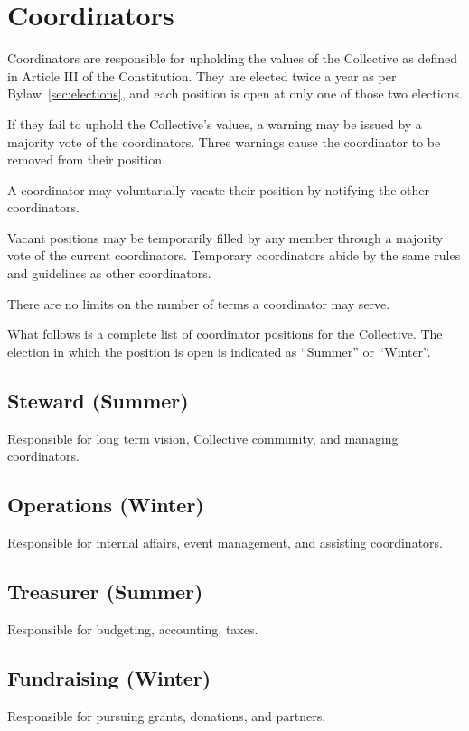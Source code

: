 \chapter{Coordinators}\label{sec:coordinators}

Coordinators are responsible for upholding the values of the Collective as defined in Article III of the Constitution. They are elected twice a year as per Bylaw~\ref{sec:elections}, and each position is open at only one of those two elections.

If they fail to uphold the Collective's values, a warning may be issued by a majority vote of the coordinators. Three warnings cause the coordinator to be removed from their position.

A coordinator may voluntarially vacate their position by notifying the other coordinators.

Vacant positions may be temporarily filled by any member through a majority vote of the current coordinators. Temporary coordinators abide by the same rules and guidelines as other coordinators.

There are no limits on the number of terms a coordinator may serve.

What follows is a complete list of coordinator positions for the Collective. The election in which the position is open is indicated as ``Summer'' or ``Winter''.

\section[Steward]{Steward (Summer)}\label{sec:steward}
Responsible for long term vision, Collective community, and managing coordinators.

\section[Operations]{Operations (Winter)}\label{sec:operations}
Responsible for internal affairs, event management, and assisting coordinators.

\section[Treasurer]{Treasurer (Summer)}\label{sec:treasurer}
Responsible for budgeting, accounting, taxes.

\section[Fundraising]{Fundraising (Winter)}\label{sec:fundraising}
Responsible for pursuing grants, donations, and partners.


